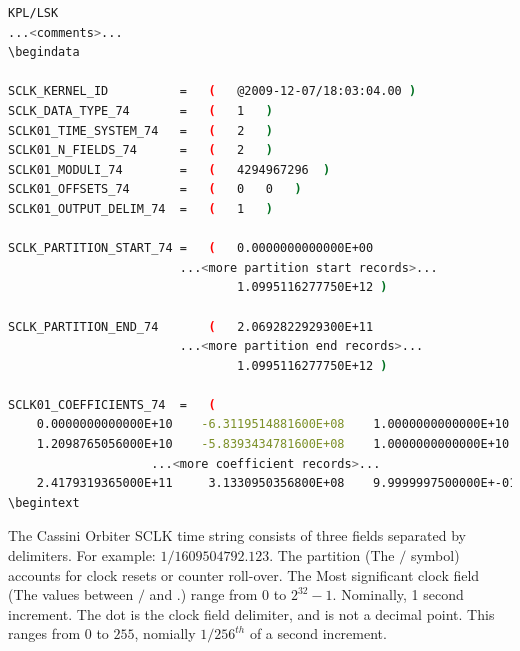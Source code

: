 \documentclass[crop=false,class=book]{standalone}
\begin{document}
\begin{lstlisting}[language=bash,basicstyle=\footnotesize]
KPL/LSK
...<comments>...
\begindata

SCLK_KERNEL_ID          =   (   @2009-12-07/18:03:04.00 )
SCLK_DATA_TYPE_74       =   (   1   )
SCLK01_TIME_SYSTEM_74   =   (   2   )
SCLK01_N_FIELDS_74      =   (   2   )
SCLK01_MODULI_74        =   (   4294967296  )
SCLK01_OFFSETS_74       =   (   0   0   )
SCLK01_OUTPUT_DELIM_74  =   (   1   )

SCLK_PARTITION_START_74 =   (   0.0000000000000E+00
                        ...<more partition start records>...
                                1.0995116277750E+12 )

SCLK_PARTITION_END_74       (   2.0692822929300E+11
                        ...<more partition end records>...
                                1.0995116277750E+12 )

SCLK01_COEFFICIENTS_74  =   (
    0.0000000000000E+10    -6.3119514881600E+08    1.0000000000000E+10
    1.2098765056000E+10    -5.8393434781600E+08    1.0000000000000E+10
                    ...<more coefficient records>...
    2.4179319365000E+11     3.1330950356800E+08    9.9999997500000E+-01 )
\begintext
\end{lstlisting}
\begin{example}
The Cassini Orbiter SCLK time string consists of three fields separated by delimiters. For example: $1/1609504792.123$. The partition (The $/$ symbol) accounts for clock resets or counter roll-over. The Most significant clock field (The values between $/$ and $.$) range from $0$ to $2^{32}-1$. Nominally, 1 second increment. The dot is the clock field delimiter, and is not a decimal point. This ranges from $0$ to $255$, nomially $1/256^{th}$ of a second increment.
\end{example}
\end{document}
